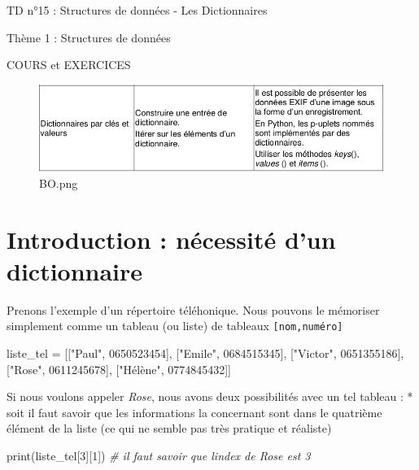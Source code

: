 \documentclass[
]{article}
\author{}
\date{}
\newenvironment{Shaded}{}{}
\newcommand{\BuiltInTok}[1]{#1}
\newcommand{\CommentTok}[1]{\textcolor[rgb]{0.38,0.63,0.69}{\textit{#1}}}
\newcommand{\DecValTok}[1]{\textcolor[rgb]{0.25,0.63,0.44}{#1}}
\newcommand{\NormalTok}[1]{#1}
\newcommand{\OperatorTok}[1]{\textcolor[rgb]{0.40,0.40,0.40}{#1}}
\newcommand{\StringTok}[1]{\textcolor[rgb]{0.25,0.44,0.63}{#1}}
\begin{document}
TD n°15 : Structures de données - Les Dictionnaires

Thème 1 : Structures de données

COURS et EXERCICES

\begin{figure}
\centering
\includegraphics{data/BO.png}
\caption{BO.png}
\end{figure}

\hypertarget{introduction-nuxe9cessituxe9-dun-dictionnaire}{%
\section{Introduction : nécessité d'un
dictionnaire}\label{introduction-nuxe9cessituxe9-dun-dictionnaire}}

Prenons l'exemple d'un répertoire téléhonique. Nous pouvons le mémoriser
simplement comme un tableau (ou liste) de tableaux
\texttt{{[}nom,numéro{]}}

\begin{Shaded}
\begin{Highlighting}[]
\NormalTok{liste\_tel }\OperatorTok{=}\NormalTok{ [[}\StringTok{"Paul"}\NormalTok{, }\StringTok{\textquotesingle{}0650523454\textquotesingle{}}\NormalTok{],}
\NormalTok{             [}\StringTok{"Emile"}\NormalTok{, }\StringTok{\textquotesingle{}0684515345\textquotesingle{}}\NormalTok{],}
\NormalTok{             [}\StringTok{"Victor"}\NormalTok{, }\StringTok{\textquotesingle{}0651355186\textquotesingle{}}\NormalTok{],}
\NormalTok{             [}\StringTok{"Rose"}\NormalTok{, }\StringTok{\textquotesingle{}0611245678\textquotesingle{}}\NormalTok{],}
\NormalTok{             [}\StringTok{"Hélène"}\NormalTok{, }\StringTok{\textquotesingle{}0774845432\textquotesingle{}}\NormalTok{]]}
\end{Highlighting}
\end{Shaded}

Si nous voulons appeler \emph{Rose}, nous avons deux possibilités avec
un tel tableau : * soit il faut savoir que les informations la
concernant sont dans le quatrième élément de la liste (ce qui ne semble
pas très pratique et réaliste)

\begin{Shaded}
\begin{Highlighting}[]
\BuiltInTok{print}\NormalTok{(liste\_tel[}\DecValTok{3}\NormalTok{][}\DecValTok{1}\NormalTok{]) }\CommentTok{\# il faut savoir que l\textquotesingle{}index de Rose est 3}
\end{Highlighting}
\end{Shaded}
\end{document}
